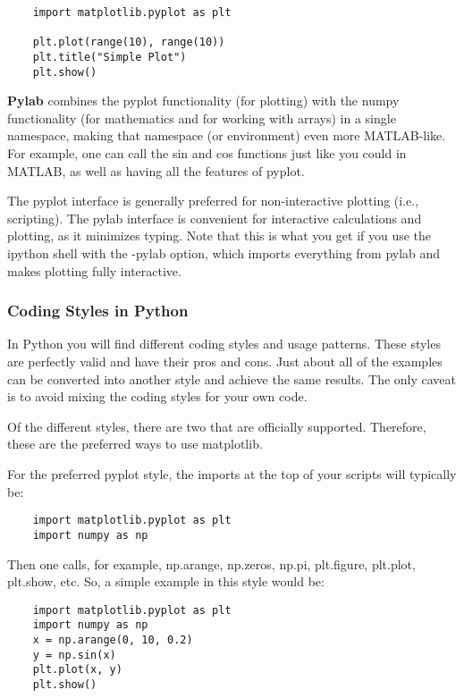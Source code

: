\begin{lstlisting}
    import matplotlib.pyplot as plt

    plt.plot(range(10), range(10))
    plt.title("Simple Plot")
    plt.show()
\end{lstlisting}

\textbf{Pylab} combines the pyplot functionality (for plotting) with the numpy functionality (for mathematics and for working with arrays) in a single namespace, making that namespace (or environment) even more MATLAB-like. For example, one can call the sin and cos functions just like you could in MATLAB, as well as having all the features of pyplot.

The pyplot interface is generally preferred for non-interactive plotting (i.e., scripting). The pylab interface is convenient for interactive calculations and plotting, as it minimizes typing. Note that this is what you get if you use the ipython shell with the -pylab option, which imports everything from pylab and makes plotting fully interactive.


\subsubsection{Coding Styles in Python}

In Python you will find different coding styles and usage patterns. These styles are perfectly valid and have their pros and cons. Just about all of the examples can be converted into another style and achieve the same results. The only caveat is to avoid mixing the coding styles for your own code.

Of the different styles, there are two that are officially supported. Therefore, these are the preferred ways to use matplotlib.

For the preferred pyplot style, the imports at the top of your scripts will typically be:

\begin{lstlisting}
    import matplotlib.pyplot as plt
    import numpy as np
\end{lstlisting}

Then one calls, for example, np.arange, np.zeros, np.pi, plt.figure, plt.plot, plt.show, etc. So, a simple example in this style would be:

\begin{lstlisting}
    import matplotlib.pyplot as plt
    import numpy as np
    x = np.arange(0, 10, 0.2)
    y = np.sin(x)
    plt.plot(x, y)
    plt.show()
\end{lstlisting}

